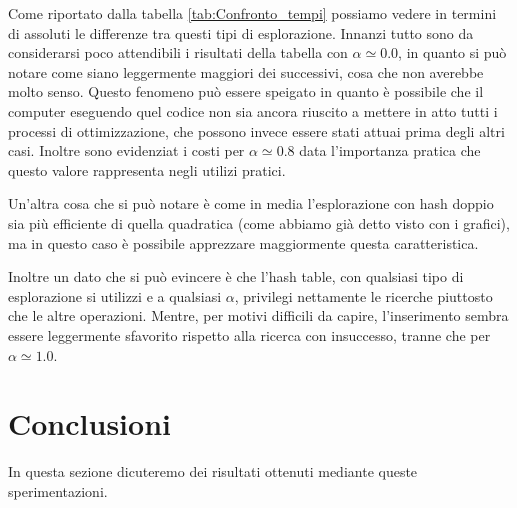 \documentclass{article}
\begin{document}
Come riportato dalla tabella \ref{tab:Confronto_tempi} possiamo vedere in termini di assoluti le differenze tra questi tipi di esplorazione. Innanzi tutto sono da considerarsi poco attendibili i risultati della tabella con $\alpha \simeq 0.0$, in quanto si può notare come siano leggermente maggiori dei successivi, cosa che non averebbe molto senso. Questo fenomeno può essere speigato in quanto è possibile che il computer eseguendo quel codice non sia ancora riuscito a mettere in atto tutti i processi di ottimizzazione, che possono invece essere stati attuai prima degli altri casi. Inoltre sono evidenziat i costi per $\alpha \simeq 0.8$ data l'importanza pratica che questo valore rappresenta negli utilizi pratici.

Un'altra cosa che si può notare è come in media l'esplorazione con hash doppio sia più efficiente di quella quadratica (come abbiamo già detto visto con i grafici), ma in questo caso è possibile apprezzare maggiormente questa caratteristica.

Inoltre un dato che si può evincere è che l'hash table, con qualsiasi tipo di esplorazione si utilizzi e a qualsiasi $\alpha$, privilegi nettamente le ricerche piuttosto che le altre operazioni. Mentre, per motivi difficili da capire, l'inserimento sembra essere leggermente sfavorito rispetto alla ricerca con insuccesso, tranne che per $\alpha \simeq 1.0$. 
\section{Conclusioni}
In questa sezione dicuteremo dei risultati ottenuti mediante queste sperimentazioni.
\end{document}
